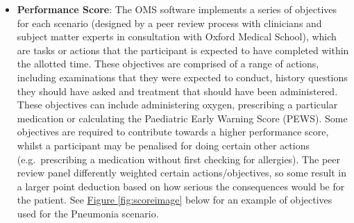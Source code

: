 \documentclass[a4paper, nobind]{templates/ociamthesis}
\providecommand{\tightlist}{%
  \setlength{\itemsep}{0pt}\setlength{\parskip}{0pt}}
\begin{document}
\begin{itemize}
\tightlist
\item
  \textbf{Performance Score}: The OMS software implements a series of objectives for each scenario (designed by a peer review process with clinicians and subject matter experts in consultation with Oxford Medical School), which are tasks or actions that the participant is expected to have completed within the allotted time. These objectives are comprised of a range of actions, including examinations that they were expected to conduct, history questions they should have asked and treatment that should have been administered. These objectives can include administering oxygen, prescribing a particular medication or calculating the Paediatric Early Warning Score (PEWS). Some objectives are required to contribute towards a higher performance score, whilst a participant may be penalised for doing certain other actions (e.g.~prescribing a medication without first checking for allergies). The peer review panel differently weighted certain actions/objectives, so some result in a larger point deduction based on how serious the consequences would be for the patient. See \hyperref[fig:scoreimage]{Figure \ref{fig:scoreimage}} below for an example of objectives used for the Pneumonia scenario.
\end{itemize}

\newpage
\end{document}
